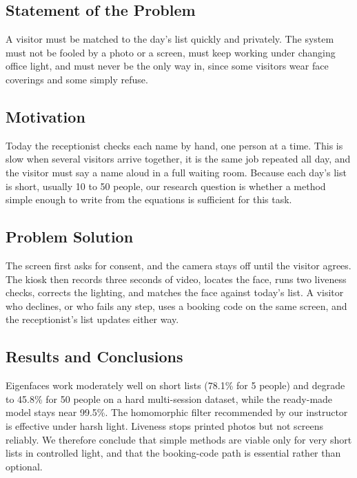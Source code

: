 \documentclass[conference,a4paper]{IEEEtran}
\begin{document}
\subsection{Statement of the Problem}
A visitor must be matched to the day's list quickly and privately. The system must not be fooled by a photo or a screen, must keep working under changing office light, and must never be the only way in, since some visitors wear face coverings and some simply refuse.

\subsection{Motivation}
Today the receptionist checks each name by hand, one person at a time. This is slow when several visitors arrive together, it is the same job repeated all day, and the visitor must say a name aloud in a full waiting room. Because each day's list is short, usually 10 to 50 people, our research question is whether a method simple enough to write from the equations is sufficient for this task.

\subsection{Problem Solution}
The screen first asks for consent, and the camera stays off until the visitor agrees. The kiosk then records three seconds of video, locates the face, runs two liveness checks, corrects the lighting, and matches the face against today's list. A visitor who declines, or who fails any step, uses a booking code on the same screen, and the receptionist's list updates either way.

\subsection{Results and Conclusions}
Eigenfaces work moderately well on short lists (78.1\% for 5 people) and degrade to 45.8\% for 50 people on a hard multi-session dataset, while the ready-made model stays near 99.5\%. The homomorphic filter recommended by our instructor is effective under harsh light. Liveness stops printed photos but not screens reliably. We therefore conclude that simple methods are viable only for very short lists in controlled light, and that the booking-code path is essential rather than optional.
\end{document}
